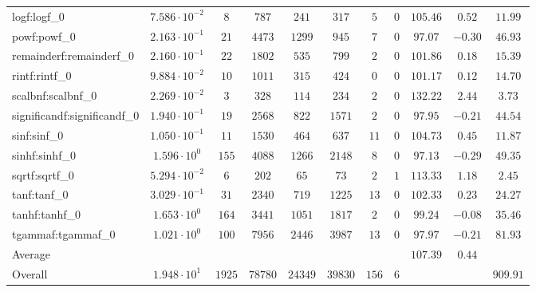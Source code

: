 \begin{tabular}{|l|c|c|c|c|c|c|c|c|c|c|}
logf:logf\_0                 & $ 7.586 \cdot 10^{-2} $ & $ 8      $ & $ 787   $ & $ 241   $ & $ 317   $ & $ 5   $ & $ 0 $ & $ 105.46      $ & $ 0.52    $ & $ 11.99   $ \\
powf:powf\_0                 & $ 2.163 \cdot 10^{-1} $ & $ 21     $ & $ 4473  $ & $ 1299  $ & $ 945   $ & $ 7   $ & $ 0 $ & $ 97.07       $ & $ -0.30   $ & $ 46.93   $ \\
remainderf:remainderf\_0     & $ 2.160 \cdot 10^{-1} $ & $ 22     $ & $ 1802  $ & $ 535   $ & $ 799   $ & $ 2   $ & $ 0 $ & $ 101.86      $ & $ 0.18    $ & $ 15.39   $ \\
rintf:rintf\_0               & $ 9.884 \cdot 10^{-2} $ & $ 10     $ & $ 1011  $ & $ 315   $ & $ 424   $ & $ 0   $ & $ 0 $ & $ 101.17      $ & $ 0.12    $ & $ 14.70   $ \\
scalbnf:scalbnf\_0           & $ 2.269 \cdot 10^{-2} $ & $ 3      $ & $ 328   $ & $ 114   $ & $ 234   $ & $ 2   $ & $ 0 $ & $ 132.22      $ & $ 2.44    $ & $ 3.73    $ \\
significandf:significandf\_0 & $ 1.940 \cdot 10^{-1} $ & $ 19     $ & $ 2568  $ & $ 822   $ & $ 1571  $ & $ 2   $ & $ 0 $ & $ 97.95       $ & $ -0.21   $ & $ 44.54   $ \\
sinf:sinf\_0                 & $ 1.050 \cdot 10^{-1} $ & $ 11     $ & $ 1530  $ & $ 464   $ & $ 637   $ & $ 11  $ & $ 0 $ & $ 104.73      $ & $ 0.45    $ & $ 11.87   $ \\
sinhf:sinhf\_0               & $ 1.596 \cdot 10^{0}  $ & $ 155    $ & $ 4088  $ & $ 1266  $ & $ 2148  $ & $ 8   $ & $ 0 $ & $ 97.13       $ & $ -0.29   $ & $ 49.35   $ \\
sqrtf:sqrtf\_0               & $ 5.294 \cdot 10^{-2} $ & $ 6      $ & $ 202   $ & $ 65    $ & $ 73    $ & $ 2   $ & $ 1 $ & $ 113.33      $ & $ 1.18    $ & $ 2.45    $ \\
tanf:tanf\_0                 & $ 3.029 \cdot 10^{-1} $ & $ 31     $ & $ 2340  $ & $ 719   $ & $ 1225  $ & $ 13  $ & $ 0 $ & $ 102.33      $ & $ 0.23    $ & $ 24.27   $ \\
tanhf:tanhf\_0               & $ 1.653 \cdot 10^{0}  $ & $ 164    $ & $ 3441  $ & $ 1051  $ & $ 1817  $ & $ 2   $ & $ 0 $ & $ 99.24       $ & $ -0.08   $ & $ 35.46   $ \\
tgammaf:tgammaf\_0           & $ 1.021 \cdot 10^{0}  $ & $ 100    $ & $ 7956  $ & $ 2446  $ & $ 3987  $ & $ 13  $ & $ 0 $ & $ 97.97       $ & $ -0.21   $ & $ 81.93   $ \\
\hline
Average                      & $                     $ & $        $ & $       $ & $       $ & $       $ & $     $ & $   $ & $ 107.39      $ & $ 0.44    $ & $         $ \\
\hline
Overall                      & $ 1.948 \cdot 10^{1}  $ & $ 1925   $ & $ 78780 $ & $ 24349 $ & $ 39830 $ & $ 156 $ & $ 6 $ & $             $ & $         $ & $ 909.91  $ \\
\hline
\end{tabular}
